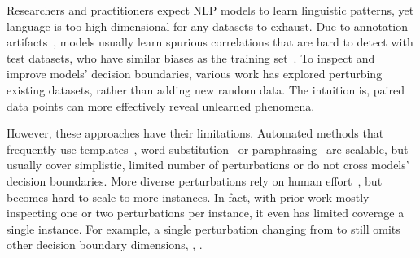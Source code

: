 
Researchers and practitioners expect NLP models to learn linguistic patterns, yet language is too high dimensional for any datasets to exhaust.
Due to annotation artifacts~\cite{gururangan2018annotation}, models usually learn spurious correlations that are hard to detect with test datasets, who have similar biases as the training set~\cite{rajpurkar-etal-2018-know}.
To inspect and improve models' decision boundaries, various work has explored perturbing existing datasets, rather than adding new random data.
The intuition is, paired data points can more effectively reveal unlearned phenomena. 


However, these approaches have their limitations. 
Automated methods that frequently use templates~\cite{li2020linguistically}, word substitution~\cite{li-etal-2020-bert-attack} or paraphrasing~\cite{iyyer2018adversarial} are scalable, but usually cover simplistic, limited number of perturbations or do not cross models' decision boundaries.
More diverse perturbations rely on human effort~\cite{gardner2020contrast, kaushik2019learning}, but becomes hard to scale to more instances.
In fact, with prior work mostly inspecting one or two perturbations per instance, it even has limited coverage a single instance.
For example, a single perturbation changing from  to  still omits other decision boundary dimensions, \eg {},  .

